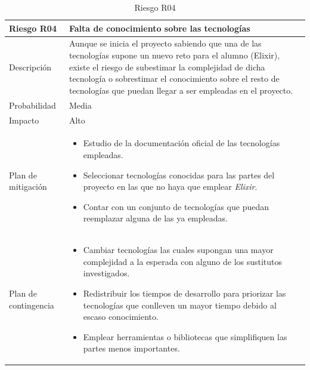 \begin{table}[H]
	\centering
	\footnotesize
	\begin{tabularx}{\textwidth}{|l|X|}
		\hline
		\rowcolor[HTML]{C0C0C0} 
		\textbf{Riesgo R04}  & \textbf{Falta de conocimiento sobre las tecnologías} \\ \hline
		Descripción          & Aunque se inicia el proyecto sabiendo que una de las tecnologías supone un nuevo reto para el alumno (Elixir), existe el riesgo de subestimar la complejidad de dicha tecnología o sobrestimar el conocimiento sobre el resto de tecnologías que puedan llegar a ser empleadas en el proyecto. \\ \hline
		Probabilidad         & Media \\ \hline
		Impacto              & Alto \\ \hline
		Plan de mitigación   & \begin{minipage}[t]{\linewidth}
			\begin{itemize}[leftmargin=*, noitemsep]
				\item Estudio de la documentación oficial de las tecnologías empleadas.
				\item Seleccionar tecnologías conocidas para las partes del proyecto en las que no haya que emplear \textit{Elixir}.
				\item Contar con un conjunto de tecnologías que puedan reemplazar alguna de las ya empleadas.
			\end{itemize}
		\end{minipage} \\ \hline
		Plan de contingencia & \begin{minipage}[t]{\linewidth}
			\begin{itemize}[leftmargin=*, noitemsep]
				\item Cambiar tecnologías las cuales supongan una mayor complejidad a la esperada con alguno de los sustitutos investigados.
				\item Redistribuir los tiempos de desarrollo para priorizar las tecnologías que conlleven un mayor tiempo debido al escaso conocimiento.
				\item Emplear herramientas o bibliotecas que simplifiquen las partes menos importantes. 
			\end{itemize}
		\end{minipage} \\ \hline
	\end{tabularx}
	\caption{Riesgo R04}
	\label{tab:riesgo_4}
\end{table}


